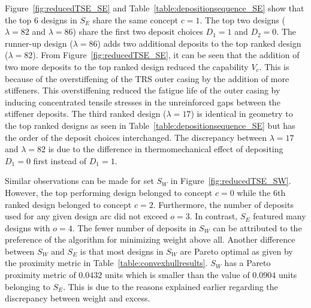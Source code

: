 Figure~\ref{fig:reducedTSE_SE} and Table~\ref{table:depositionsequence_SE} show that the top 6 designs in $S_E$ share the same concept $c=1$. The top two designs ($\lambda = 82$ and $\lambda = 86$) share the first two deposit choices $D_1=1$ and $D_2=0$. The runner-up design ($\lambda = 86$) adds two additional deposits to the top ranked design ($\lambda = 82$). From Figure~\ref{fig:reducedTSE_SE}, it can be seen that the addition of two more deposits to the top ranked design reduced the capability $V_c$. This is because of the overstiffening of the \ac{TRS} outer casing by the addition of more stiffeners. This overstiffening reduced the fatigue life of the outer casing by inducing concentrated tensile stresses in the unreinforced gaps between the stiffener deposits. The third ranked design ($\lambda = 17$) is identical in geometry to the top ranked designs as seen in Table~\ref{table:depositionsequence_SE} but has the order of the deposit choices interchanged. The discrepancy between $\lambda = 17$ and $\lambda = 82$ is due to the difference in thermomechanical effect of depositing $D_1=0$ first instead of $D_1=1$.

Similar observations can be made for set $S_W$ in Figure~\ref{fig:reducedTSE_SW}. However, the top performing design belonged to concept $c=0$ while the 6th ranked design belonged to concept $c=2$. Furthermore, the number of deposits used for any given design arc did not exceed $o=3$. In contrast, $S_E$ featured many designs with $o=4$. The fewer number of deposits in $S_W$ can be attributed to the preference of the algorithm for minimizing weight above all. Another difference between $S_W$ and $S_E$ is that most designs in $S_W$ are Pareto optimal as given by the proximity metric in Table~\ref{table:convexhullresults}. $S_W$ has a Pareto proximity metric of $0.0432$ units which is smaller than the value of $0.0904$ units belonging to $S_E$. This is due to the reasons explained earlier regarding the discrepancy between weight and excess.  


\newcommand{\resultsCW}{1.7cm}
\newcommand{\dARA}{\texttt{[image: table\_E\_results/C1D1.pdf]}}
\newcommand{\dBRA}{\texttt{[image: table\_E\_results/C1D10.pdf]}}

